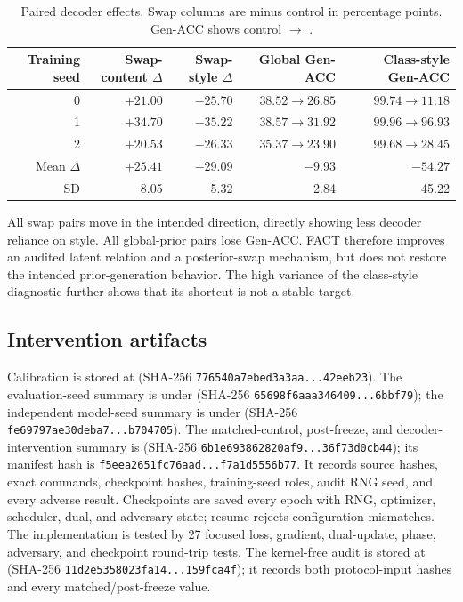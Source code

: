 \begin{table}[ht]
\caption{Paired decoder effects.  Swap columns are \FACT{} minus control in
percentage points.  Gen-ACC shows control $\rightarrow$ \FACT{}.}
\label{tab:fact-decoder}
\centering
\scriptsize
\setlength{\tabcolsep}{4pt}
\begin{tabular}{rrrrr}
\toprule
Training seed & Swap-content $\Delta$ & Swap-style $\Delta$ & Global Gen-ACC & Class-style Gen-ACC \\
\midrule
0 & $+21.00$ & $-25.70$ & $38.52\to26.85$ & $99.74\to11.18$ \\
1 & $+34.70$ & $-35.22$ & $38.57\to31.92$ & $99.96\to96.93$ \\
2 & $+20.53$ & $-26.33$ & $35.37\to23.90$ & $99.68\to28.45$ \\
\midrule
Mean $\Delta$ & $+25.41$ & $-29.09$ & $-9.93$ & $-54.27$ \\
SD & 8.05 & 5.32 & 2.84 & 45.22 \\
\bottomrule
\end{tabular}
\end{table}

All swap pairs move in the intended direction, directly showing less decoder
reliance on style.  All global-prior pairs lose Gen-ACC.  FACT therefore
improves an audited latent relation and a posterior-swap mechanism, but does not
restore the intended prior-generation behavior.  The high variance of the
class-style diagnostic further shows that its shortcut is not a stable target.

\subsection{Intervention artifacts}

Calibration is stored at
(SHA-256 \texttt{776540a7ebed3a3aa...42eeb23}).  The evaluation-seed summary
is under 
(SHA-256 \texttt{65698f6aaa346409...6bbf79}); the independent model-seed
summary is under
(SHA-256 \texttt{fe69797ae30deba7...b704705}).  The matched-control,
post-freeze, and decoder-intervention summary is
(SHA-256 \texttt{6b1e693862820af9...36f73d0cb44}); its manifest hash is
\texttt{f5eea2651fc76aad...f7a1d5556b77}.  It records source hashes, exact
commands, checkpoint hashes, training-seed roles, audit RNG seed, and every
adverse result.  Checkpoints are saved every epoch with RNG, optimizer,
scheduler, dual, and adversary state; resume rejects configuration mismatches.
The implementation is tested by 27 focused loss, gradient, dual-update, phase,
adversary, and checkpoint round-trip tests.
The kernel-free audit is stored at
 (SHA-256
\texttt{11d2e5358023fa14...159fca4f}); it records both protocol-input hashes
and every matched/post-freeze value.

